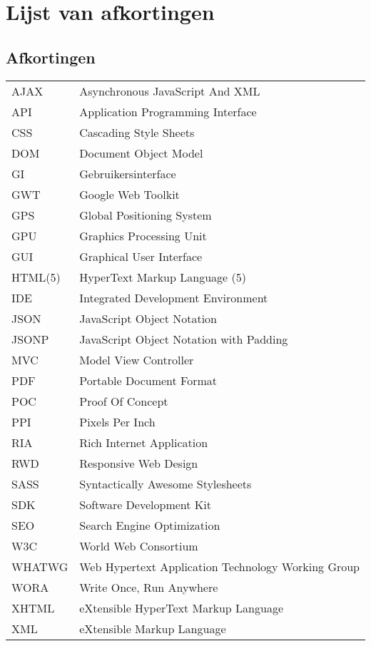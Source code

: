 \documentclass[master=cws,dutch,masteroption={vs,gs},inputenc=utf8]{kulemt}
\begin{document}
\chapter{Lijst van afkortingen}
\section*{Afkortingen}
\begin{flushleft}
  \renewcommand{\arraystretch}{1.1}
  \begin{tabularx}{\textwidth}{@{}p{2cm}X@{}}
     AJAX & Asynchronous JavaScript And XML \\
     API & Application Programming Interface \\
     CSS & Cascading Style Sheets \\
     DOM & Document Object Model \\
     GI & Gebruikersinterface \\
     GWT & Google Web Toolkit \\
     GPS & Global Positioning System \\
     GPU & Graphics Processing Unit \\
     GUI & Graphical User Interface \\
     HTML(5) & HyperText Markup Language (5) \\
     IDE & Integrated Development Environment \\
     JSON & JavaScript Object Notation \\
     JSONP & JavaScript Object Notation with Padding \\
     MVC & Model View Controller \\
     PDF & Portable Document Format \\
     POC & Proof Of Concept \\
     PPI & Pixels Per Inch \\
     RIA & Rich Internet Application \\
     RWD & Responsive Web Design \\
     SASS & Syntactically Awesome Stylesheets \\
     SDK & Software Development Kit \\
     SEO & Search Engine Optimization \\
     W3C & World Web Consortium \\
     WHATWG & Web Hypertext Application Technology Working Group \\
     WORA & Write Once, Run Anywhere \\
     XHTML & eXtensible HyperText Markup Language \\ 
     XML & eXtensible Markup Language
  \end{tabularx}
\end{flushleft}
\end{document}

